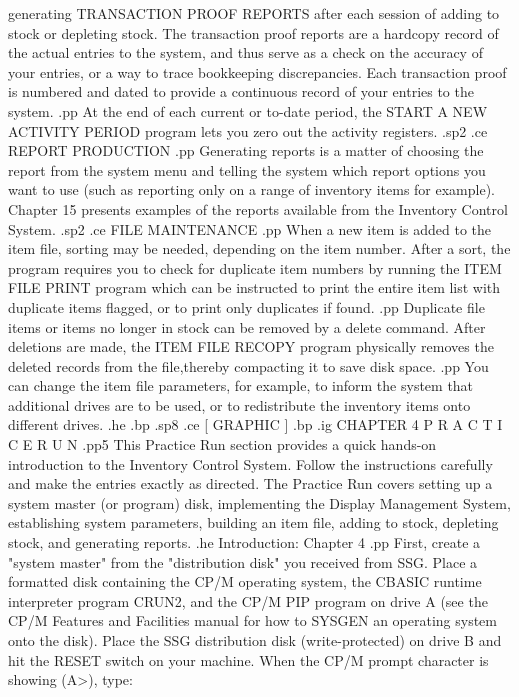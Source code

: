 generating TRANSACTION PROOF REPORTS after each session of adding to stock
or depleting stock.  The transaction proof reports are a hardcopy record
of the actual entries to the system, and thus serve as a check on the
accuracy of your entries, or a way to trace bookkeeping discrepancies.
Each transaction proof is numbered and dated to provide a continuous record of
your entries to the system.
.pp
At the end of each current or to-date period, the START A NEW ACTIVITY PERIOD
program lets you zero out the activity registers.
.sp2
.ce
REPORT PRODUCTION
.pp
Generating reports is a matter of choosing the report from the system
menu and telling the system which report options you want to use (such
as reporting only on a range of inventory items for example).  Chapter
15 presents examples of the reports available from the Inventory Control
System.
.sp2
.ce
FILE MAINTENANCE
.pp
When a new item is added to the item file, sorting may be needed,
depending on the item number.  After a sort, the program requires you
to check for duplicate item numbers by running the ITEM FILE
PRINT program which
can be instructed to print the entire item list with duplicate items flagged,
or to print only duplicates if found.
.pp
Duplicate file items or items no longer in stock can be removed by a delete
command.  After deletions are made, the ITEM FILE RECOPY program physically
removes the deleted records from the file,thereby compacting it to save disk
space.
.pp
You can change the item file parameters, for example, to inform the system
that additional drives are to be used, or to redistribute the inventory
items onto different drives.
.he
.bp
.sp8
.ce
[ GRAPHIC ]
.bp
.ig
CHAPTER 4
P R A C T I C E    R U N
.pp5
This Practice Run section provides a quick hands-on introduction to the
Inventory Control System.  Follow the instructions carefully and
make the entries exactly
as directed.  The Practice Run covers setting up a system
master (or program) disk, implementing the Display Management System,
establishing system parameters, building an item file, adding to stock,
depleting stock, and generating reports.
.he Introduction: Chapter 4
.pp
First, create a "system master" from the "distribution disk" you received
from SSG.  Place a formatted disk containing the CP/M operating
system, the CBASIC runtime interpreter program CRUN2, and the CP/M
PIP program on drive A (see the CP/M Features and Facilities manual
for how to SYSGEN an operating system onto the disk).  Place the SSG
distribution disk (write-protected)
on drive B and hit the RESET switch on your machine.
When the CP/M prompt character is showing (A>), type:
